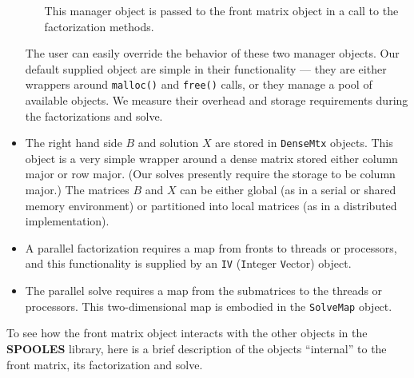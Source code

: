 \begin{itemize}
\begin{itemize}
This manager object is passed to the front matrix object in a call
to the factorization methods.
\end{itemize}
The user can easily override the behavior of these two 
manager objects.
Our default supplied object are simple in their functionality 
--- they are either wrappers around {\tt malloc()} and {\tt free()}
calls, or they manage a pool of available objects.
We measure their overhead and storage requirements during the
factorizations and solve.
\item
The right hand side $B$ and solution $X$ are stored in
{\tt DenseMtx} objects.
This object is a very simple wrapper around a dense matrix stored
either column major or row major.
(Our solves presently require the storage to be column major.)
The matrices $B$ and $X$ can be either global (as in a serial or
shared memory environment) or partitioned into local matrices
(as in a distributed implementation).
\item
A parallel factorization requires a map from fronts to threads
or processors,
and this functionality is supplied by an {\tt IV} ({\tt I}nteger
{\tt V}ector) object.
\item
The parallel solve requires a map from the submatrices to the
threads or processors.
This two-dimensional map is embodied in the {\tt SolveMap} object.
\end{itemize}
\par
To see how the front matrix object interacts with the other objects
in the {\bf SPOOLES} library, here is a brief description of the
objects ``internal'' to the front matrix, its factorization and solve.
\par
